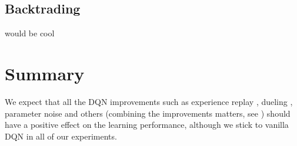 \subsection{Backtrading}
would be cool

\section{Summary}
We expect that all the DQN improvements such as experience replay \cite{...}, dueling \cite{...}, parameter noise \cite{...} and others (combining the improvements matters, see \cite{...}) should have a positive effect on the learning performance, although we stick to vanilla DQN in all of our experiments.

